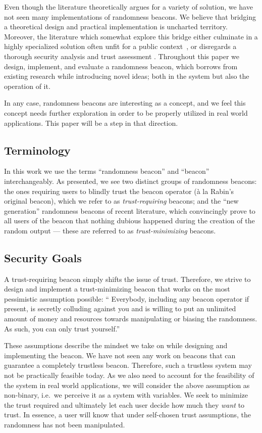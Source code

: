 Even though the literature theoretically argues for a variety of solution, we have not seen many implementations of randomness beacons.
We believe that bridging a theoretical design and practical implementation is uncharted territory.
Moreover, the literature which somewhat explore this bridge either culminate in a highly specialized solution often unfit for a public context~\cite{syta2017scalable,cascudo2017scrape}, or disregards a thorough security analysis and trust assessment .
Throughout this paper we design, implement, and evaluate a randomness beacon, which borrows from existing research while introducing novel ideas; both in the system but also the operation of it.

In any case, randomness beacons are interesting as a concept, and we feel this concept needs further exploration in order to be properly utilized in real world applications. This paper will be a step in that direction.

\subsection{Terminology}
In this work we use the terms \enquote{randomness beacon} and \enquote{beacon} interchangeably.
As presented, we see two distinct groups of randomness beacons: the ones requiring users to blindly trust the beacon operator (à la Rabin's original beacon), which we refer to as \emph{trust-requiring} beacons; and the \enquote{new generation} randomness beacons of recent literature, which convincingly prove to all users of the beacon that nothing dubious happened during the creation of the random output --- these are referred to as \emph{trust-minimizing} beacons.

\subsection{Security Goals}\label{sec:security_goals}
A trust-requiring beacon simply shifts the issue of trust.
Therefore, we strive to design and implement a trust-minimizing beacon that works on the most pessimistic assumption possible:
\enquote{%
Everybody, including any beacon operator if present, is secretly colluding against you and is willing to put an unlimited amount of money and resources towards manipulating or biasing the randomness.
As such, you can only trust yourself.}

These assumptions describe the mindset we take on while designing and implementing the beacon.
We have not seen any work on beacons that can guarantee a completely trustless beacon. Therefore, such a trustless system may not be practically feasible today.
As we also need to account for the feasibility of the system in real world applications, we will consider the above assumption as non-binary, i.e.\ we perceive it as a system with variables.
We seek to minimize the trust required and ultimately let each user decide how much they \emph{want} to trust.
In essence, a user will know that under self-chosen trust assumptions, the randomness has not been manipulated.

